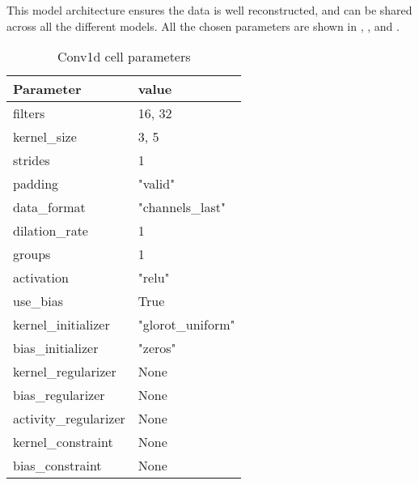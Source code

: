 This model architecture ensures the data is well reconstructed,
and can be shared across all the different models.
All the chosen parameters are shown in ,
, and
.


\begin{table}[h]
  \centering
  \caption{Conv1d cell parameters}
  \label{table:Conv1d-cell-parameters}
  \begin{tabular}{|l|l|}\hline
    Parameter             & value             \\ \hline
    \hline
    filters               & 16, 32            \\ \hline
    kernel\_size          & 3, 5              \\ \hline
    strides               & 1                 \\ \hline
    padding               & "valid"           \\ \hline
    data\_format          & "channels\_last"  \\ \hline
    dilation\_rate        & 1                 \\ \hline
    groups                & 1                 \\ \hline
    activation            & "relu"            \\ \hline
    use\_bias             & True              \\ \hline
    kernel\_initializer   & "glorot\_uniform" \\ \hline
    bias\_initializer     & "zeros"           \\ \hline
    kernel\_regularizer   & None              \\ \hline
    bias\_regularizer     & None              \\ \hline
    activity\_regularizer & None              \\ \hline
    kernel\_constraint    & None              \\ \hline
    bias\_constraint      & None              \\ \hline
    \hline
  \end{tabular}
\end{table}

